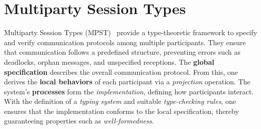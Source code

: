 



\section{Multiparty Session Types}
Multiparty Session Types (MPST)~\cite{honda2008multiparty} 
provide a type-theoretic framework to specify and verify communication 
protocols among multiple participants. They ensure that communication 
follows a predefined structure, preventing errors such as deadlocks, 
orphan messages, and unspecified receptions. The 
\textbf{global specification} describes the overall communication 
protocol. From this, one derives the \textbf{local behaviors} of each 
participant via a \emph{projection} operation. The system's 
\textbf{processes} form the \emph{implementation}, defining how 
participants interact. With the definition of a \emph{typing system} 
and suitable \emph{type-checking rules}, one ensures that the 
implementation conforms to the local specification, thereby 
guaranteeing properties such as \emph{well-formedness}.  

